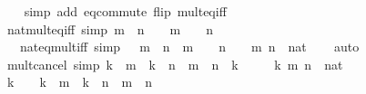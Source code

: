 \begin{isabellebody}
%
\isadelimproof
\ \ %
\endisadelimproof
%
\isatagproof
{}\isamarkupfalse%
\ {\isacharparenleft}{\kern0pt}simp\ add{\isacharcolon}{\kern0pt}\ eq{\isacharunderscore}{\kern0pt}commute\ flip{\isacharcolon}{\kern0pt}\ mult{\isacharunderscore}{\kern0pt}eq{\isacharunderscore}{\kern0pt}{}{\isacharunderscore}{\kern0pt}iff{\isacharparenright}{\kern0pt}%
\endisatagproof
{\isafoldproof}%
%
\isadelimproof
\isanewline
%
\endisadelimproof
\isanewline
{}\isamarkupfalse%
\ nat{\isacharunderscore}{\kern0pt}mult{\isacharunderscore}{\kern0pt}eq{\isacharunderscore}{\kern0pt}{}{\isacharunderscore}{\kern0pt}iff\ {\isacharbrackleft}{\kern0pt}simp{\isacharbrackright}{\kern0pt}{\isacharcolon}{\kern0pt}\ {\isachardoublequoteopen}m\ {\isacharasterisk}{\kern0pt}\ n\ {\isacharequal}{\kern0pt}\ {}\ {\isasymlongleftrightarrow}\ m\ {\isacharequal}{\kern0pt}\ {}\ {\isasymand}\ n\ {\isacharequal}{\kern0pt}\ {}{\isachardoublequoteclose}\ \isanewline
\ \ \ nat{\isacharunderscore}{\kern0pt}{}{\isacharunderscore}{\kern0pt}eq{\isacharunderscore}{\kern0pt}mult{\isacharunderscore}{\kern0pt}iff\ {\isacharbrackleft}{\kern0pt}simp{\isacharbrackright}{\kern0pt}{\isacharcolon}{\kern0pt}\ {\isachardoublequoteopen}{}\ {\isacharequal}{\kern0pt}\ m\ {\isacharasterisk}{\kern0pt}\ n\ {\isasymlongleftrightarrow}\ m\ {\isacharequal}{\kern0pt}\ {}\ {\isasymand}\ n\ {\isacharequal}{\kern0pt}\ {}{\isachardoublequoteclose}\ \ m\ n\ {\isacharcolon}{\kern0pt}{\isacharcolon}{\kern0pt}\ nat\isanewline
%
\isadelimproof
\ \ %
\endisadelimproof
%
\isatagproof
{}\isamarkupfalse%
\ auto%
\endisatagproof
{\isafoldproof}%
%
\isadelimproof
\isanewline
%
\endisadelimproof
\isanewline
{}\isamarkupfalse%
\ mult{\isacharunderscore}{\kern0pt}cancel{}\ {\isacharbrackleft}{\kern0pt}simp{\isacharbrackright}{\kern0pt}{\isacharcolon}{\kern0pt}\ {\isachardoublequoteopen}k\ {\isacharasterisk}{\kern0pt}\ m\ {\isacharequal}{\kern0pt}\ k\ {\isacharasterisk}{\kern0pt}\ n\ {\isasymlongleftrightarrow}\ m\ {\isacharequal}{\kern0pt}\ n\ {\isasymor}\ k\ {\isacharequal}{\kern0pt}\ {}{\isachardoublequoteclose}\isanewline
\ \ \ k\ m\ n\ {\isacharcolon}{\kern0pt}{\isacharcolon}{\kern0pt}\ nat\isanewline
%
\isadelimproof
%
\endisadelimproof
%
\isatagproof
{}\isamarkupfalse%
\ {\isacharminus}{\kern0pt}\isanewline
\ \ \isamarkupfalse%
\ {\isachardoublequoteopen}k\ {\isasymnoteq}\ {}\ {\isasymLongrightarrow}\ k\ {\isacharasterisk}{\kern0pt}\ m\ {\isacharequal}{\kern0pt}\ k\ {\isacharasterisk}{\kern0pt}\ n\ {\isasymLongrightarrow}\ m\ {\isacharequal}{\kern0pt}\ n{\isachardoublequoteclose}\isanewline

\end{isabellebody}
